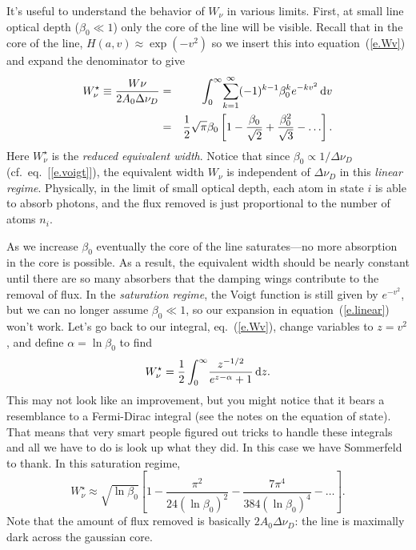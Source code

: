 It's useful to understand the behavior of $W_{\nu}$ in various limits.  
First, at small line optical depth ($\beta_{0}\ll 1$) only the core of the line will be visible. Recall that in the core of the line, $H(a,v) \approx \exp(-v^{2})$ so we insert this into equation~(\ref{e.Wv}) and expand the denominator to give
\begin{eqnarray}\label{e.linear}
W_{\nu}^{\star} \equiv \frac{W{\nu}}{2A_{0}\Delta\nu_{D}} &=& \int_{0}^{\infty} \!\sum_{k=1}^{\infty}(-1)^{k-1}\beta_{0}^{k}e^{-kv^{2}}\,\mathrm{d} v\nonumber\\
 &=& \frac{1}{2}\sqrt{\pi}\beta_{0}\left[1-\frac{\beta_{0}}{\sqrt{2}} + \frac{\beta_{0}^{2}}{\sqrt{3}} - \ldots\right].
\end{eqnarray}
Here $W_{\nu}^{\star}$ is the \emph{reduced equivalent width}.
Notice that since $\beta_{0}\propto 1/\Delta\nu_{D}$ (cf.~eq.~[\ref{e.voigt}]), the equivalent width $W_{\nu}$ is independent of $\Delta\nu_{D}$ in this \emph{linear regime}.
Physically, in the limit of small optical depth, each atom in state $i$ is able to absorb photons, and the flux removed  is just proportional to the number of atoms $n_{i}$.

As we increase $\beta_{0}$ eventually the core of the line saturates---no more absorption in the core is possible.  As a result, the equivalent width should be nearly constant until there are so many absorbers that the damping wings contribute to the removal of flux.  In the \emph{saturation regime}, the Voigt function is still given by $e^{-v^{2}}$, but we can no longer assume $\beta_{0}\ll 1$, so our expansion in equation~(\ref{e.linear}) won't work. Let's go back to our integral, eq.~(\ref{e.Wv}), change variables to $z= v^{2}$, and define $\alpha = \ln\beta_{0}$ to find
\[
W_{\nu}^{\star} = \frac{1}{2}\int_{0}^{\infty}\!\frac{z^{-1/2}}{e^{z-\alpha}+1}\,\mathrm{d} z.
\]
This may not look like an improvement, but you might notice that it bears a resemblance to a Fermi-Dirac integral (see the notes on the equation of state). That means that very smart people figured out tricks to handle these integrals and all we have to do is look up what they did.  In this case we have Sommerfeld to thank. In this saturation regime,
\begin{equation}\label{e.saturation}
W_{\nu}^{\star} \approx \sqrt{\ln\beta_{0}}\left[ 1 - \frac{\pi^{2}}{24(\ln\beta_{0})^{2}} - \frac{7\pi^{4}}{384(\ln\beta_{0})^{4}}-\ldots\right].
\end{equation}
Note that the amount of flux removed is basically $2A_{0}\Delta\nu_{D}$: the line is maximally dark across the gaussian core.

